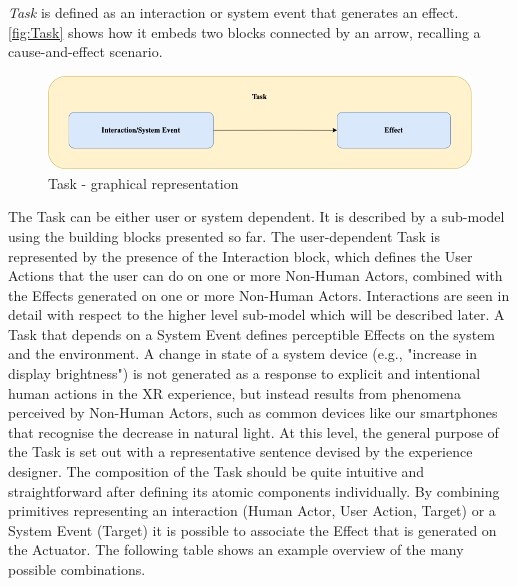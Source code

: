 \emph{Task} is defined as an interaction or system event that generates an effect. \autoref{fig:Task} shows how it embeds two blocks connected by an arrow, recalling a cause-and-effect scenario.
\begin{figure}[h]
	\centering
	\includegraphics[width=12cm]{Figures/Conceptual Model/Task.png}
	\caption{Task - graphical representation}
	\label{fig:Task}
\end{figure}
The Task can be either user or system dependent. It is described by a sub-model using the building blocks presented so far. 
The user-dependent Task is represented by the presence of the Interaction block, which defines the User Actions that the user can do on one or more Non-Human Actors, combined with the Effects generated on one or more Non-Human Actors. Interactions are seen in detail with respect to the higher level sub-model which will be described later. 
A Task that depends on a System Event defines perceptible Effects on the system and the environment. A change in state of a system device (e.g., "increase in display brightness") is not generated as a response to explicit and intentional human actions in the XR experience, but instead results from phenomena perceived by Non-Human Actors, such as common devices like our smartphones that recognise the decrease in natural light.
At this level, the general purpose of the Task is set out with a representative sentence devised by the experience designer. The composition of the Task should be quite intuitive and straightforward after defining its atomic components individually.
By combining primitives representing an interaction (Human Actor, User Action, Target) or a System Event (Target) it is possible to associate the Effect that is generated on the Actuator. The following table shows an example overview of the many possible combinations. 

